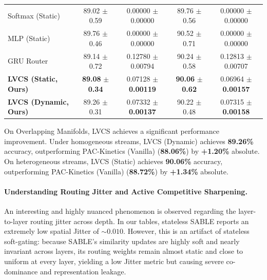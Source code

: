\begin{table}[t]
\begin{center}
\begin{small}
\begin{sc}
\begin{tabular}{lcccc}
Softmax (Static) & 89.02 $\pm$ 0.59 & 0.00000 $\pm$ 0.00000 & 89.76 $\pm$ 0.56 & 0.00000 $\pm$ 0.00000 \\
MLP (Static) & 89.76 $\pm$ 0.46 & 0.00000 $\pm$ 0.00000 & 90.52 $\pm$ 0.71 & 0.00000 $\pm$ 0.00000 \\
GRU Router & 89.14 $\pm$ 0.72 & 0.12780 $\pm$ 0.00794 & 90.24 $\pm$ 0.58 & 0.12813 $\pm$ 0.00707 \\
\textbf{LVCS (Static, Ours)} & \textbf{89.08} $\pm$ \textbf{0.34} & 0.07128 $\pm$ \textbf{0.00119} & \textbf{90.06} $\pm$ \textbf{0.62} & 0.06964 $\pm$ \textbf{0.00157} \\
\textbf{LVCS (Dynamic, Ours)} & 89.26 $\pm$ 0.31 & 0.07332 $\pm$ \textbf{0.00137} & 90.22 $\pm$ 0.48 & 0.07315 $\pm$ \textbf{0.00158} \\
\bottomrule
\end{tabular}
\end{sc}
\end{small}
\end{center}
\vskip -0.1in
\end{table}

On Overlapping Manifolds, LVCS achieves a significant performance improvement. Under homogeneous streams, LVCS (Dynamic) achieves \textbf{89.26\%} accuracy, outperforming PAC-Kinetics (Vanilla) (\textbf{88.06\%}) by \textbf{+1.20\%} absolute. On heterogeneous streams, LVCS (Static) achieves \textbf{90.06\%} accuracy, outperforming PAC-Kinetics (Vanilla) (\textbf{88.72\%}) by \textbf{+1.34\%} absolute. 

\paragraph{Understanding Routing Jitter and Active Competitive Sharpening.}
An interesting and highly nuanced phenomenon is observed regarding the layer-to-layer routing jitter across depth. In our tables, stateless SABLE reports an extremely low spatial Jitter of $\sim 0.010$. However, this is an artifact of stateless soft-gating: because SABLE's similarity updates are highly soft and nearly invariant across layers, its routing weights remain almost static and close to uniform at every layer, yielding a low Jitter metric but causing severe co-dominance and representation leakage. 

